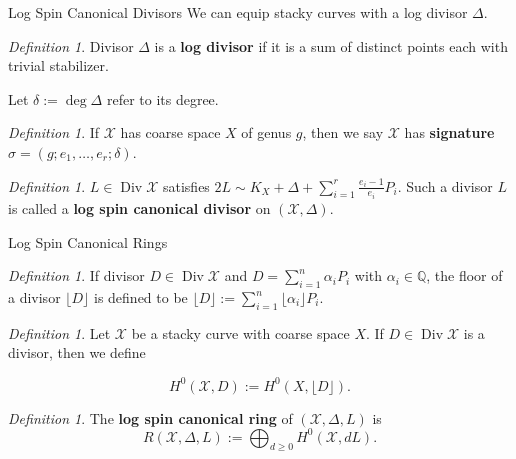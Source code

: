 \documentclass{beamer}
\theoremstyle{remark}
\newtheorem{defn}[thm]{Definition}
\newcommand\BQ{{\mathbb Q}}
\newcommand \sx{{\mathscr X}}
\DeclareMathOperator\di{Div}
\newcommand{\halfcan}{L}
\begin{document}

\begin{frame}{Log Spin Canonical Divisors}
We can equip stacky curves with a log divisor $\Delta$.

\begin{defn}
Divisor $\Delta$ is a \textbf{log divisor} if it is a sum of distinct
points each with trivial stabilizer.

Let $\delta := \deg \Delta$ refer to its degree.
\end{defn}


\begin{defn}
If $\sx$ has coarse space $X$ of genus $g$, then we say $\sx$ has
\textbf{signature} $\sigma = (g; e_1, \ldots, e_r; \delta)$.
\end{defn}


\begin{defn}
$\halfcan \in \di
\sx$ satisfies $2 \halfcan \sim K_X + \Delta + \sum_{i = 1}^{r}
\frac{e_i - 1}{e_i} P_i$. Such a divisor $\halfcan$ is called a
\textbf{log spin canonical divisor} on $(\sx, \Delta)$.
\end{defn}

\end{frame}


\begin{frame}{Log Spin Canonical Rings}

\begin{defn}
If divisor $D \in \di \sx$ and $D = \sum_{i = 1}^{n} \alpha_i P_i$
with $\alpha_i \in \BQ$, the floor of a divisor $\lfloor D
\rfloor$ is defined to be $\lfloor D \rfloor := \sum_{i = 1}^{n}
\lfloor \alpha_i \rfloor P_i$.
\end{defn}


\begin{defn}
Let $\sx$ be a stacky curve with coarse space $X$.
If $D \in \di \sx$ is a divisor, then we define

\[
	H^0(\sx, D) := H^0(X, \lfloor D \rfloor).
\]
\end{defn}


\begin{defn}
The {\bf log spin canonical ring} of $(\sx, \Delta, \halfcan)$ is
\[
	R(\sx, \Delta, \halfcan) := \bigoplus_{d \geq 0} H^0(\sx, d \halfcan).
\]
\end{defn}

\end{frame}

\end{document}
